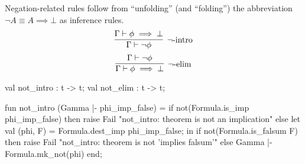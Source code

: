 \begin{node}
Negation-related rules follow from ``unfolding'' (and ``folding'') the abbreviation $\neg A\equiv A\implies\bot$
as inference rules.
\begin{equation}
\vcenter{\infer[\neg\mbox{-intro}]{\Gamma\vdash\neg\phi}{\Gamma\vdash\phi\implies\bot}}
\end{equation}
\begin{equation}
\vcenter{\infer[\neg\mbox{-elim}]{\Gamma\vdash\phi\implies\bot}{\Gamma\vdash\neg\phi}}
\end{equation}
\end{node}

\nwenddocs{}\plusendmoddef\nwstartdeflinemarkup{}\nwenddeflinemarkup
val not_intro : t -> t;
val not_elim : t -> t;
\nwendcode{}\nwdocspar

\nwenddocs{}\plusendmoddef\nwstartdeflinemarkup{}\nwenddeflinemarkup
fun not_intro (Gamma |- phi_imp_false) =
  if not(Formula.is_imp phi_imp_false)
  then raise Fail "not_intro: theorem is not an implication"
  else let
    val (phi, F) = Formula.dest_imp phi_imp_false;
  in
    if not(Formula.is_falsum F)
    then raise Fail "not_intro: theorem is not 'implies falsum'"
    else Gamma |- Formula.mk_not(phi)
  end;

